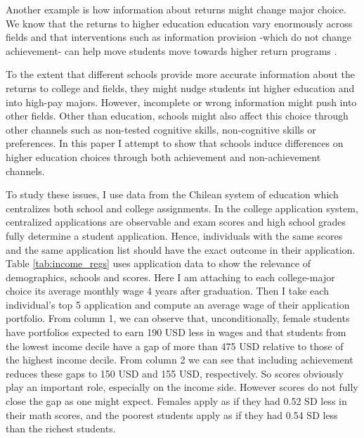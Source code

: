 \documentclass[12pt]{article}
\begin{document}
Another example is how information about returns might change major choice. We know that the returns to higher education education vary enormously across fields \parencite{kirkeboen_field_2016} and that interventions such as information provision -which do not change achievement- can help move students move towards higher return programs \parencite{hastings_informed_2016}. 

To the extent that different schools provide more accurate information about the returns to college and fields, they might nudge students int higher education and into high-pay majors. However, incomplete or wrong information might push into other fields. Other than education, schools might also affect this choice through other channels such as non-tested cognitive skills, non-cognitive skills or preferences.  In this paper I attempt to show that schools induce differences on higher education choices through both achievement and non-achievement channels.


To study these issues, I use data from the Chilean system of education which centralizes both school and college assignments. In the college application system, centralized applications are observable and exam scores and high school grades fully determine a student application. Hence, individuals with the same scores and the same application list should have the exact outcome in their application. Table \ref{tab:income_regs} uses application data to show the relevance of demographics, schools and scores. Here I am attaching to each college-major choice its average monthly wage 4 years after graduation. Then I take each individual's top 5 application and compute an average wage of their application portfolio.  From column 1, we can observe that, unconditionally, female students have portfolios expected to earn 190 USD less in wages and that students from the lowest income decile have a gap of more than 475 USD relative to those of the highest income decile. From column 2 we can see that including achievement reduces these gaps to 150 USD and 155 USD, respectively. So scores obviously play an important role, especially on the income side. However scores do not fully close the gap as one might expect. Females apply as if they had 0.52 SD less in their math scores, and the poorest students apply as if they had 0.54 SD less than the richest students.  
\end{document}
